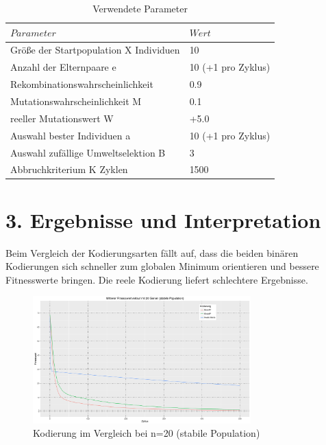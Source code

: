 \documentclass[12pt,
    a4paper,
    headinclude,
    footinclude]{scrreprt}
\begin{document}
\begin{table}[h]
	\centering
	\caption*{Verwendete Parameter}
	\begin{tabularx}{14cm}{|p{9cm}|X|}
		\hline
		$Parameter$ & $Wert$ \\
		\hline
		\hline
		Größe der Startpopulation X Individuen& 10  \\
				\hline
		Anzahl der Elternpaare e & 10 (+1 pro Zyklus)  \\
				\hline
		Rekombinationswahrscheinlichkeit& 0.9 \\
				\hline
		Mutationswahrscheinlichkeit M & 0.1 \\
				\hline
		reeller Mutationswert W& +5.0  \\
				\hline
		Auswahl bester Individuen a& 10 (+1 pro Zyklus) \\
		\hline
		Auswahl zufällige Umweltselektion B& 3 \\
		\hline
		Abbruchkriterium K Zyklen & 1500\\
		\hline
	\end{tabularx}
\end{table}


	
\section*{3. Ergebnisse und Interpretation}	

Beim Vergleich der Kodierungsarten fällt auf, dass die beiden binären Kodierungen sich schneller zum globalen Minimum orientieren und bessere Fitnesswerte bringen. Die reele Kodierung liefert schlechtere Ergebnisse.
		\begin{figure}[H]
			\includegraphics[width=0.75\textwidth]{../best-20-stable.jpeg}
			\caption*{Kodierung im Vergleich bei n=20 (stabile Population)} 
			\label{InputOutput}
		\end{figure}
\end{document}
